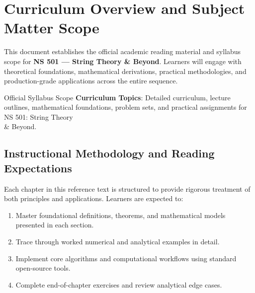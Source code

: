 \section{Curriculum Overview and Subject Matter Scope}

This document establishes the official academic reading material and syllabus scope for \textbf{NS 501 --- String Theory \& Beyond}. Learners will engage with theoretical foundations, mathematical derivations, practical methodologies, and production-grade applications across the entire sequence.

\begin{InsightBox}{Official Syllabus Scope}
  \textbf{Curriculum Topics}: Detailed curriculum, lecture outlines, mathematical foundations, problem sets, and practical assignments for NS 501: String Theory \\& Beyond.
\end{InsightBox}

\subsection{Instructional Methodology and Reading Expectations}

Each chapter in this reference text is structured to provide rigorous treatment of both principles and applications. Learners are expected to:
\begin{enumerate}
  \item Master foundational definitions, theorems, and mathematical models presented in each section.
  \item Trace through worked numerical and analytical examples in detail.
  \item Implement core algorithms and computational workflows using standard open-source tools.
  \item Complete end-of-chapter exercises and review analytical edge cases.
\end{enumerate}

